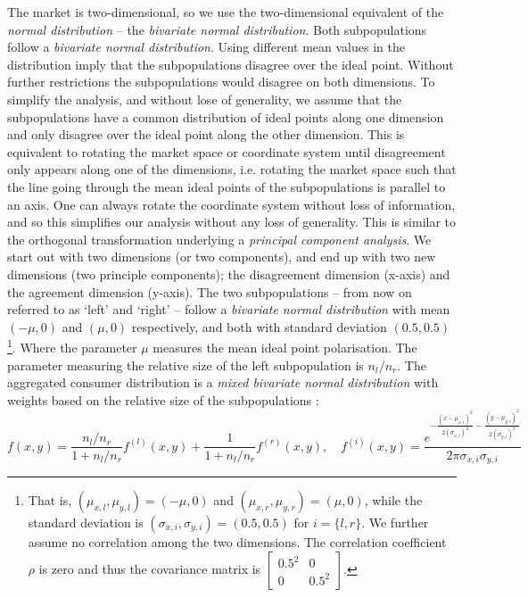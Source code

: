 \documentclass[preprint, 12pt]{elsarticle}
\begin{document}
The market is two-dimensional, so we use the two-dimensional equivalent of the \emph{normal distribution} -- the \emph{bivariate normal distribution}. Both subpopulations follow a \emph{bivariate normal distribution}. Using different mean values in the distribution imply that the subpopulations disagree over the ideal point. Without further restrictions the subpopulations would disagree on both dimensions. To simplify the analysis, and without lose of generality, we assume that the subpopulations have a common distribution of ideal points along one dimension and only disagree over the ideal point along the other dimension. This is equivalent to rotating the market space or coordinate system until disagreement only appears along one of the dimensions, i.e. rotating the market space such that the line going through the mean ideal points of the subpopulations is parallel to an axis. One can always rotate the coordinate system without loss of information, and so this simplifies our analysis without any loss of generality. This is similar to the orthogonal transformation underlying a \emph{principal component analysis}. We start out with two dimensions (or two components), and end up with two new dimensions (two principle components); the disagreement dimension (x-axis) and the agreement dimension (y-axis). The two subpopulations -- from now on referred to as `left' and `right' -- follow a \emph{bivariate normal distribution} with mean $(-\mu,0)$ and $(\mu,0)$ respectively, and both with standard deviation $(0.5, 0.5)$\footnote{That is, $(\mu_{x,l},\mu_{y,l}) = (-\mu,0)$ and $(\mu_{x,r},\mu_{y,r}) = (\mu,0)$, while the standard deviation is $(\sigma_{x,i},\sigma_{y,i}) = (0.5, 0.5)$ for $i = \{l,r\}$. We further assume no correlation among the two dimensions. The correlation coefficient $\rho$ is zero and thus the covariance matrix is $\left[ {\begin{array}{*{20}{c}} {{{0.5}^2}}&0\\ 0&{{{0.5}^2}} \end{array}} \right]$.}. Where the parameter $\mu$ measures the mean ideal point polarisation. The parameter measuring the relative size of the left subpopulation is $n_l/n_r$. The aggregated consumer distribution is a \emph{mixed bivariate normal distribution} with weights based on the relative size of the subpopulations \citep{Weisstein_2002b, Balakrishnan_Lai_2009}:
\begin{equation}
f(x,y) = \frac{n_l/n_r}{1+n_l/n_r} f^{(l)}(x,y) + \frac{1}{1+n_l/n_r} f^{(r)}(x,y), \quad f^{(i)}(x,y) = \frac{e^{-\frac{(x-\mu_{x,i})^2}{2(\sigma_{x,i})^2} - \frac{(y-\mu_{y,i})^2}{2(\sigma_{y,i})^2}}}{2\pi\sigma_{x,i}\sigma_{y,i}}
\end{equation}
\end{document}
